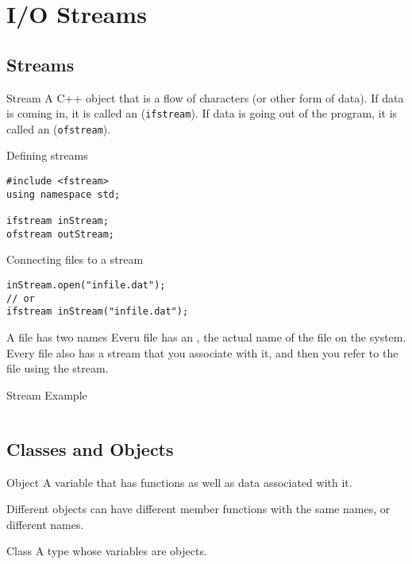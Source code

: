 \documentclass[\main/notes.tex]{subfiles}
\begin{document}
	\setcounter{chapter}{1}
	\chapter{I/O Streams}
		\section{Streams}
			\begin{definition}{Stream}
				A C++ object that is a flow of characters (or other form of data). If data is coming in, it is called an  (\texttt{ifstream}). If data is going out of the program, it is called an  (\texttt{ofstream}).
			\end{definition}
			\begin{codebox}{Defining streams}
				\begin{verbatim}
#include <fstream>
using namespace std;

ifstream inStream;
ofstream outStream;
			\end{verbatim}
		\end{codebox}
		\begin{codebox}{Connecting files to a stream}
			\begin{verbatim}
inStream.open("infile.dat");
// or
ifstream inStream("infile.dat");
				\end{verbatim}
			\end{codebox}
			\begin{sidenote}{A file has two names}
				Everu file has an , the actual name of the file on the system. Every file also has a stream that you associate with it, and then you refer to the file using the stream.
			\end{sidenote}
			\pagebreak
			\begin{codebox}{Stream Example}
				\inputminted[]{cpp}{\subfix{code/01_example.cpp}}
			\end{codebox}

		\section{Classes and Objects}
			\begin{definition}{Object}
				A variable that has functions as well as data associated with it.
			\end{definition}
			Different objects can have different member functions with the same names, or different names.
			\begin{definition}{Class}
				A type whose variables are objects.
			\end{definition}
\end{document}
